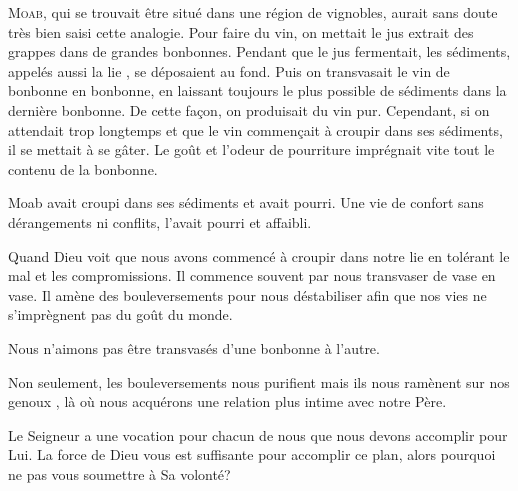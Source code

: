 \dvrule







\lettrine{M}{oab,} qui se trouvait être situé
 dans une région de vignobles, aurait sans doute très bien saisi
 cette analogie. Pour faire du vin, on mettait le jus extrait des grappes
 dans de grandes bonbonnes. Pendant que le jus fermentait, les sédiments,
 appelés aussi \Og la lie \Fg{}, se déposaient au fond.
 Puis on transvasait le vin de bonbonne en bonbonne, en laissant toujours
 le plus possible de sédiments dans la dernière bonbonne.
 De cette fa\c{c}on, on produisait du vin pur.
 Cependant, si on attendait trop longtemps et que le vin commen\c{c}ait à croupir
 dans ses sédiments, il se mettait à se gâter.
 Le goût et l'odeur de pourriture imprégnait vite tout le contenu
 de la bonbonne. 

Moab avait croupi dans ses sédiments et avait pourri.
 Une vie de confort sans dérangements ni conflits, l'avait pourri et affaibli. 

Quand Dieu voit que nous avons commencé à croupir dans notre lie
 en tolérant le mal et les compromissions.
 Il commence souvent par nous transvaser de vase en vase.
 Il amène des bouleversements pour nous déstabiliser afin que nos vies
 ne s'imprègnent pas du goût du monde. 

Nous n'aimons pas être transvasés d'une bonbonne à l'autre. 


Non seulement, les bouleversements nous purifient mais ils nous ramènent
 \Og sur nos genoux \Fg{}, là où nous acquérons une relation plus intime
 avec notre Père. 

Le Seigneur a une vocation pour chacun de nous que nous devons accomplir
 pour Lui. La force de Dieu vous est suffisante pour accomplir ce plan,
 alors pourquoi ne pas vous soumettre à Sa volonté? 

\dvrule




